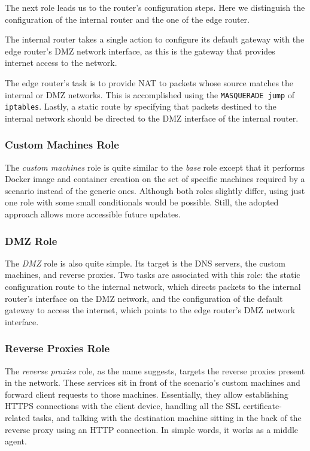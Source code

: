 The next role leads us to the router's configuration steps. Here we distinguish the configuration of the internal router and the one of the edge router. 

The internal router takes a single action to configure its default gateway with the edge router's DMZ network interface, as this is the gateway that provides internet access to the network.

The edge router's task is to provide NAT to packets whose source matches the internal or DMZ networks. This is accomplished using the \texttt{MASQUERADE jump} of \texttt{iptables}. Lastly, a static route by specifying that packets destined to the internal network should be directed to the DMZ interface of the internal router.

\subsubsection{Custom Machines Role} \label{sec:ansible_custom_machines_role}

The \textit{custom machines} role is quite similar to the \textit{base} role except that it performs Docker image and container creation on the set of specific machines required by a scenario instead of the generic ones. Although both roles slightly differ, using just one role with some small conditionals would be possible. Still, the adopted approach allows more accessible future updates.

\subsubsection{DMZ Role} \label{sec:ansible_dmz_role}

The \textit{DMZ} role is also quite simple. Its target is the DNS servers, the custom machines, and reverse proxies. Two tasks are associated with this role: the static configuration route to the internal network, which directs packets to the internal router's interface on the DMZ network, and the configuration of the default gateway to access the internet, which points to the edge router's DMZ network interface.

\subsubsection{Reverse Proxies Role} \label{sec:ansible_reverse_proxies_role}

The \textit{reverse proxies} role, as the name suggests, targets the reverse proxies present in the network. These services sit in front of the scenario's custom machines and forward client requests to those machines. Essentially, they allow establishing HTTPS connections with the client device, handling all the SSL certificate-related tasks, and talking with the destination machine sitting in the back of the reverse proxy using an HTTP connection. In simple words, it works as a middle agent.


